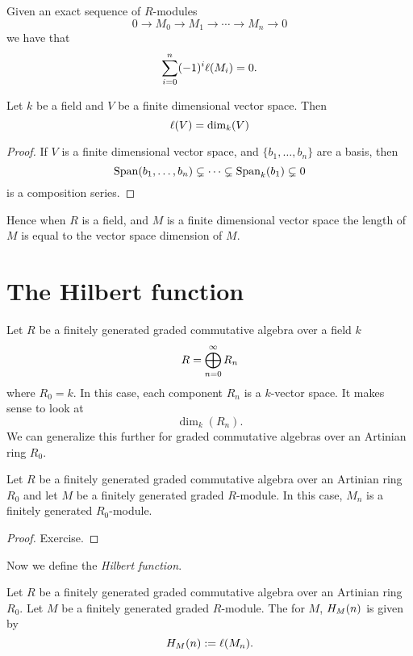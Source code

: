 \documentclass{ximera}
\begin{document}
\begin{corollary}\label{C:Lles}
  Given an exact sequence of $R$-modules
  \[
  0 \to M_0\to M_1\to \cdots \to M_n \to 0
  \]
  we have that
  \[
  \sum_{i=0}^n (-1)^i \ell(M_i) = 0.
  \]
\end{corollary}



\begin{proposition}
  Let $k$ be a field and $V$ be a finite dimensional vector
  space. Then
  \[
  \ell(V) = \dim_k(V)
  \]
  \begin{proof}
    If $V$ is a finite dimensional vector space, and
    $\{b_1,\dots,b_n\}$ are a basis, then
    \[
    \operatorname{Span}(b_1,\dots,b_n) \subsetneq \dots \subsetneq \operatorname{Span}_k(b_1) \subsetneq 0
    \]
    is a composition series.
  \end{proof}
\end{proposition}


Hence when $R$ is a field, and $M$ is a finite dimensional vector
space the length of $M$ is equal to the vector space dimension of $M$.




\section{The Hilbert function}

Let $R$ be a finitely generated graded commutative algebra over a
field $k$
\[
R = \bigoplus_{n=0}^\infty R_n
\]
where $R_0 = k$.  In this case, each component $R_n$ is a $k$-vector
space. It makes sense to look at
\[
\dim_k(R_n).
\]
We can generalize this further for graded commutative algebras over an
Artinian ring $R_0$.

\begin{lemma}
  Let $R$ be a finitely generated graded commutative algebra over an
  Artinian ring $R_0$ and let $M$ be a finitely generated graded
  $R$-module.  In this case, $M_n$ is a finitely generated
  $R_0$-module.
  \begin{proof}
    Exercise.
  \end{proof}
\end{lemma}


Now we define the \textit{Hilbert function}.

\begin{definition}
  Let $R$ be a finitely generated graded commutative algebra over an
  Artinian ring $R_0$. Let $M$ be a finitely generated graded
  $R$-module. The  for $M$, $H_M(n)$ is given by
  \[
  H_M(n) := \ell(M_n).
  \]
\end{definition}
\end{document}
